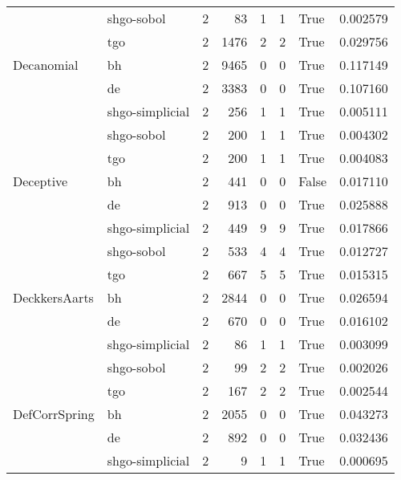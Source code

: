 \begin{longtable}{llrrrrlr}
         & shgo-sobol &     2 &       83 &      1 &       1 &    True &    0.002579 \\
         & tgo &     2 &     1476 &      2 &       2 &    True &    0.029756 \\
Decanomial & bh &     2 &     9465 &      0 &       0 &    True &    0.117149 \\
         & de &     2 &     3383 &      0 &       0 &    True &    0.107160 \\
         & shgo-simplicial &     2 &      256 &      1 &       1 &    True &    0.005111 \\
         & shgo-sobol &     2 &      200 &      1 &       1 &    True &    0.004302 \\
         & tgo &     2 &      200 &      1 &       1 &    True &    0.004083 \\
Deceptive & bh &     2 &      441 &      0 &       0 &   False &    0.017110 \\
         & de &     2 &      913 &      0 &       0 &    True &    0.025888 \\
         & shgo-simplicial &     2 &      449 &      9 &       9 &    True &    0.017866 \\
         & shgo-sobol &     2 &      533 &      4 &       4 &    True &    0.012727 \\
         & tgo &     2 &      667 &      5 &       5 &    True &    0.015315 \\
DeckkersAarts & bh &     2 &     2844 &      0 &       0 &    True &    0.026594 \\
         & de &     2 &      670 &      0 &       0 &    True &    0.016102 \\
         & shgo-simplicial &     2 &       86 &      1 &       1 &    True &    0.003099 \\
         & shgo-sobol &     2 &       99 &      2 &       2 &    True &    0.002026 \\
         & tgo &     2 &      167 &      2 &       2 &    True &    0.002544 \\
DefCorrSpring & bh &     2 &     2055 &      0 &       0 &    True &    0.043273 \\
         & de &     2 &      892 &      0 &       0 &    True &    0.032436 \\
         & shgo-simplicial &     2 &        9 &      1 &       1 &    True &    0.000695 \\

\end{longtable}
